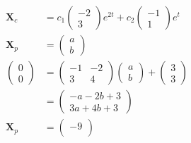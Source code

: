 \documentclass{article}
\begin{document}
\begin{align*}
  \mathbf{X}_c    & = c_1 \begin{pmatrix}
                            -2 \\
                            3
                          \end{pmatrix} e^{2 t} + c_2 \begin{pmatrix}
                                                        -1 \\
                                                        1
                                                      \end{pmatrix} e^t                  \\
  \mathbf{X}_p    & = \begin{pmatrix}
                        a \\
                        b
                      \end{pmatrix}                                                     \\
  \begin{pmatrix}
    0 \\
    0
  \end{pmatrix} & = \begin{pmatrix}
                      -1 & -2 \\
                      3  & 4
                    \end{pmatrix} \begin{pmatrix}
                                    a \\
                                    b
                                  \end{pmatrix} + \begin{pmatrix}
                                                    3 \\
                                                    3
                                                  \end{pmatrix}                         \\
                  & = \begin{pmatrix}
                        -a - 2 b + 3 \\
                        3 a + 4 b + 3
                      \end{pmatrix}                                                     \\
  \mathbf{X}_p    & = \begin{pmatrix}
                        -9 \\

\end{pmatrix}
\end{align*}
\end{document}
